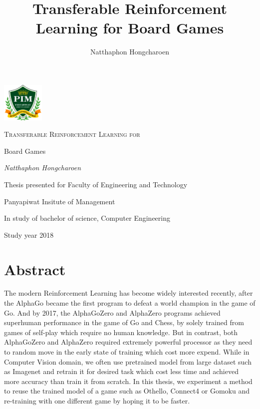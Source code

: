 \documentclass[12pt,a4paper]{article}
\title{Transferable Reinforcement Learning for Board Games}
\author{Natthaphon Hongcharoen}
\begin{document}

\begin{titlepage}
	\centering
	\includegraphics[width=0.15\textwidth]{logo.png}\par\vspace{1cm}
	{\scshape\Huge Transferable Reinforcement Learning for \par Board Games\par}
	\vfill
	{\Large\itshape Natthaphon Hongcharoen\par}
	\vfill
	{\Large  \par}
	{\large Thesis presented for Faculty of Engineering and Technology \par\vspace{0.1cm}}
	{\large Panyapiwat Insitute of Management\par\vspace{0.1cm}}
	{\large In study of bachelor of science, Computer Engineering
	}


	{\large Study year 2018 \par}
\end{titlepage}

\clearpage %
\pagestyle{empty}  %

\section*{Abstract}
The modern Reinforcement Learning has become widely interested recently, after the AlphaGo\cite{AlphaGo} became the first program to defeat a world champion in the game of Go. And by 2017, the AlphaGoZero\cite{AlphaGoZero} and AlphaZero\cite{AlphaZero} programs achieved superhuman performance in the game of Go and Chess, by solely trained from games of self-play which require no human knowledge. But in contrast, both AlphaGoZero and AlphaZero required extremely powerful processor as they need to random move in the early state of training which cost more expend. While in Computer Vision domain, we often use pretrained model from large dataset such as Imagenet\cite{Imagenet} and retrain it for desired task which cost less time and achieved more accuracy than train it from scratch. In this thesis, we experiment a method to reuse the trained model of a game such as Othello, Connect4 or Gomoku and re-training with one different game by hoping it to be faster.


\end{document}
